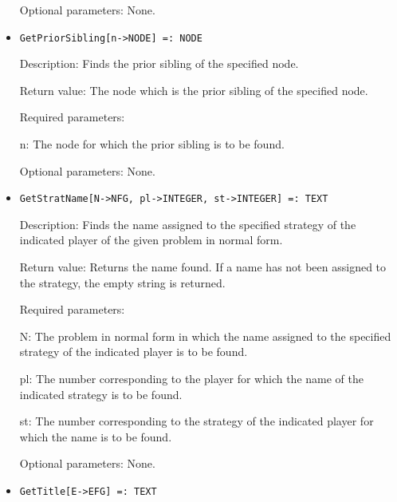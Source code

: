 \begin{itemize}
\item
[Optional parameters:] None.
\ed

\item
\protect \large \begin{verbatim}
GetPriorSibling[n->NODE] =: NODE
\end{verbatim}\normalsize

\bd
\item
[Description:] Finds the prior sibling of the specified node.
\item
[Return value:] The node which is the prior sibling of the specified node.
\item
[Required parameters:]\hfil\null

\bd
\item
[ n:] The node for which the prior sibling is to be found.
\ed

\item
[Optional parameters:] None.
\ed

\item
\protect \large \begin{verbatim}
GetStratName[N->NFG, pl->INTEGER, st->INTEGER] =: TEXT
\end{verbatim}\normalsize

\bd
\item
[Description:] Finds the name assigned to the specified strategy of
the indicated player of the given problem in normal form.
\item
[Return value:] Returns the name found.  If a name has not been assigned
to the strategy, the empty string is returned.
\item
[Required parameters:]\hfil\null

\bd
\item
[ N:] The problem in normal form in which the name assigned to the
specified strategy of the indicated player is to be found.
\item
[ pl:] The number corresponding to the player for which the name of
the indicated strategy is to be found.
\item
[ st:] The number corresponding to the strategy of the indicated 
player for which the name is to be found.
\ed

\item
[Optional parameters:] None.
\ed

\item
\protect \large \begin{verbatim}
GetTitle[E->EFG] =: TEXT
\end{verbatim}\normalsize


\end{itemize}
